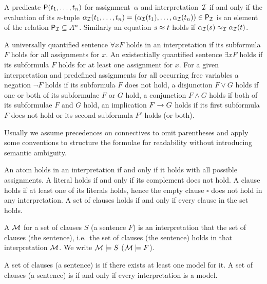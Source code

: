 \begin{definition}\label{def:semantics:atoms}
	A predicate \( \mathsf{P}(t_1,\ldots,t_n) \)
	 for assignment~\( \alpha \)
	and interpretation~\( \mathcal{I} \)
	if and only if the evaluation of its \(n\)-tuple \(
	\alpha_{\mathcal{I}}(t_1,\ldots,t_n) = (\alpha_{\mathcal{I}}({t_1}),\ldots,\alpha_{\mathcal{I}}({t_n})) \in \mathsf{P}_{\mathcal{I}} \)
	is an element of the relation \( \mathsf{P}_{\mathcal{I}}\subseteq A^n \).
	Similarly an equation \( s\approx t \)
	holds if \( \alpha_{\mathcal{I}}(s) \approx_{\mathcal{I}} \alpha_{\mathcal{I}}(t) \).
\end{definition}

\begin{definition}
	\label{def:semantics:FOF}
	A universally quantified sentence \( \forall x F \)
	holds in an interpretation if its subformula \( F \) holds for all assignments for \( x \).
	An existentially quantified sentence \( \exists xF \) holds if its subformula \( F \) holds for at least one assignment for \( x \).
	For a given interpretation and predefined assignments for all occurring free variables
	a negation \( \lnot F \) holds if its subformula \( F \) does not hold,
	a disjunction \( F\lor G \) holds if one or both of its subformulae \( F \) or \( G \) hold,
	a conjunction \( F\land G \) holds if both of its subformulae \( F \) and \( G \) hold,
	an implication \( F\rightarrow G \) holds if its first subformula \( F \) does not hold or its second subformula \( F' \) holds (or both).

	\begin{remark}Usually we assume precedences on connectives to omit parentheses
		and apply some conventions to structure the formulae for readability
		without introducing semantic ambiguity.
	\end{remark}
\end{definition}

\begin{definition}\label{def:semantics:CNF}
	An atom holds in an interpretation if and only if it
	holds with all possible assignments.
	A literal holds if and only if its complement does not hold.
	A clause holds if at least one of its literals holds,
	hence the empty clause \( \square \) does not hold in any interpretation.
	A set of clauses holds if and only if every clause in the set holds.
\end{definition}

\begin{definition}
	A  \( \mathcal{M} \) for a set of clauses \( S \) (a sentence \( F \))
	is an interpretation that
	 the set of clauses (the sentence),
	i.e.~the set of clauses (the sentence) holds in that interpretation \( \mathcal{M} \).
	We write \( \mathcal{M}\models S \) (\( \mathcal{M}\models F \)).

	A set of clauses (a sentence) is  if there exists at least one model for it.
	A set of clauses (a sentence) is  if and only if every interpretation is a model.
\end{definition}

